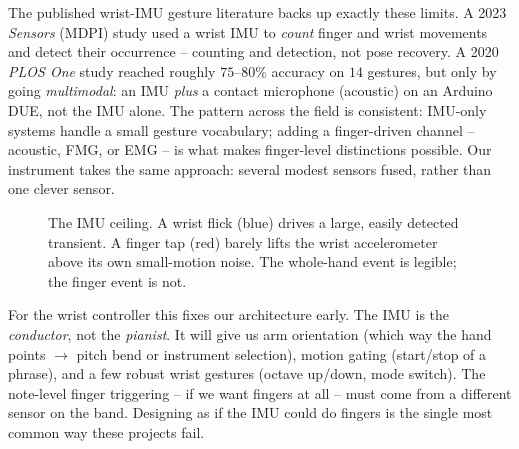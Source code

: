 \begin{applicationbox}
The published wrist-IMU gesture literature backs up exactly these limits. A 2023
\emph{Sensors} (MDPI) study used a wrist IMU to \emph{count} finger and wrist
movements and detect their occurrence -- counting and detection, not pose recovery.
A 2020 \emph{PLOS One} study reached roughly $75$--$80\%$ accuracy on $14$ gestures,
but only by going \emph{multimodal}: an IMU \emph{plus} a contact
microphone (acoustic) on an Arduino DUE, not the IMU alone. The pattern across the
field is consistent: IMU-only systems handle a small gesture vocabulary; adding a
finger-driven channel -- acoustic, FMG, or EMG -- is what makes finger-level
distinctions possible. Our instrument takes the same approach: several modest sensors
fused, rather than one clever sensor.
\end{applicationbox}

\begin{figure}[H]
\centering
{}
\caption{The IMU ceiling. A wrist flick (blue) drives a large, easily detected
transient. A finger tap (red) barely lifts the wrist accelerometer above its own
small-motion noise. The whole-hand event is legible; the finger event is not.}
\label{ch37:fig-imu-ceiling}
\end{figure}

\begin{goalbox}
For the wrist controller this fixes our architecture early. The IMU is the
\emph{conductor}, not the \emph{pianist}. It will give us arm orientation (which way
the hand points $\to$ pitch bend or instrument selection), motion gating (start/stop
of a phrase), and a few robust wrist gestures (octave up/down, mode switch). The
note-level finger triggering -- if we want fingers at all -- must come from a
different sensor on the band. Designing as if the IMU could do fingers is the single
most common way these projects fail.
\end{goalbox}

